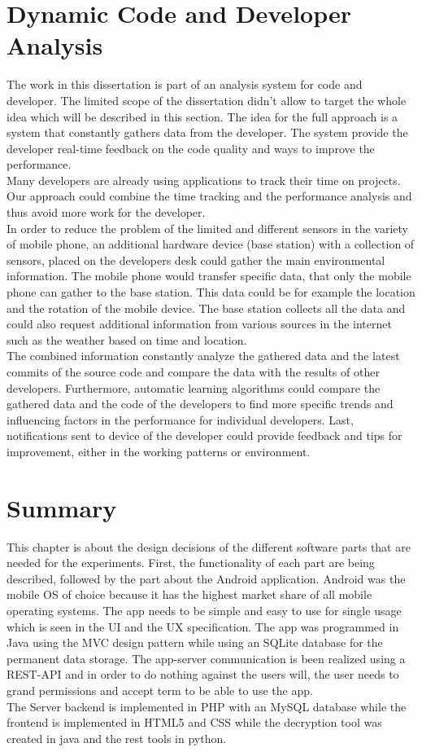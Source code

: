 \section{Dynamic Code and Developer Analysis}
The work in this dissertation is part of an analysis system for code and developer. The limited scope of the dissertation didn't allow to target the whole idea which will be described in this section. 
\bigbreak
The idea for the full approach is a system that constantly gathers data from the developer. The system provide the developer real-time feedback on the code quality and ways to improve the performance.\\
Many developers are already using applications to track their time on projects. Our approach could combine the time tracking and the performance analysis and thus avoid more work for the developer. \\
In order to reduce the problem of the limited and different sensors in the variety of mobile phone, an additional hardware device (base station) with a collection of sensors, placed on the developers desk could gather the main environmental information. The mobile phone would transfer specific data, that only the mobile phone can gather to the base station. This data could be for example the location and the rotation of the mobile device. The base station collects all the data and could also request additional information from various sources in the internet such as the weather based on time and location.\\
The combined information constantly analyze the gathered data and the latest commits of the source code and compare the data with the results of other developers. Furthermore, automatic learning algorithms could compare the gathered data and the code of the developers to find more specific trends and influencing factors in the performance for individual developers. 
Last, notifications sent to device of the developer could provide feedback and tips for improvement, either in the working patterns or environment. 

\section{Summary}
This chapter is about the design decisions of the different software parts that are needed for the experiments. First, the functionality of each part are being described, followed by the part about the Android application. Android was the mobile OS of choice because it has the highest market share of all mobile operating systems. The app needs to be simple and easy to use for single usage which is seen in the UI and the UX specification. 
The app was programmed in Java using the MVC design pattern while using an SQLite database for the permanent data storage. The app-server communication is been realized using a REST-API and in order to do nothing against the users will, the user needs to grand permissions and accept term to be able to use the app. \\
The Server backend is implemented in PHP with an MySQL database while the frontend is implemented in HTML5 and CSS while the decryption tool was created in java and the rest tools in python. 